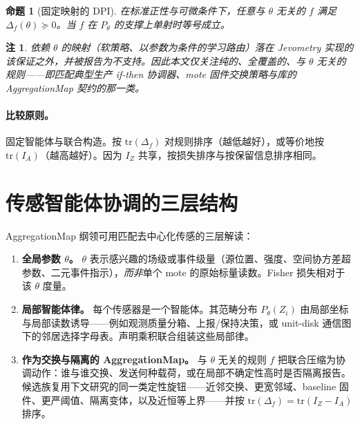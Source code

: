 \documentclass[11pt,a4paper]{article}
\newtheorem{proposition}{命题}
\newtheorem{remark}{注}
\begin{document}
\begin{proposition}[固定映射的 DPI]
在标准正性与可微条件下，任意与 $\theta$ 无关的 $f$ 满足 $\Delta_f(\theta)\succeq 0$。当 $f$ 在 $P_\theta$ 的支撑上单射时等号成立。
\end{proposition}

\begin{remark}
依赖 $\theta$ 的映射（软策略、以参数为条件的学习路由）落在 Jevometry 实现的该保证之外，并被报告为不支持。因此本文仅关注纯的、全覆盖的、与 $\theta$ 无关的规则——即匹配典型生产 if-then 协调器、mote 固件交换策略与库的 AggregationMap 契约的那一类。
\end{remark}

\paragraph{比较原则。}
固定智能体与联合构造。按 $\mathrm{tr}(\Delta_f)$ 对规则排序（越低越好），或等价地按 $\mathrm{tr}(I_A)$（越高越好）。因为 $I_Z$ 共享，按损失排序与按保留信息排序相同。

\section{传感智能体协调的三层结构}
\label{sec:sensor-layers}

AggregationMap 纲领可用匹配去中心化传感的三层解读：

\begin{enumerate}
  \item[(i)] \textbf{全局参数 $\theta$。}
  $\theta$ 表示感兴趣的场级或事件级量（源位置、强度、空间协方差超参数、二元事件指示），\emph{而非}单个 mote 的原始标量读数。Fisher 损失相对于该 $\theta$ 度量。

  \item[(ii)] \textbf{局部智能体律。}
  每个传感器是一个智能体。其范畴分布 $P_\theta(Z_i)$ 由局部坐标与局部读数诱导——例如观测质量分箱、上报/保持决策，或 unit-disk 通信图下的邻居选择字母表。声明乘积联合组装这些局部律。

  \item[(iii)] \textbf{作为交换与隔离的 AggregationMap。}
  与 $\theta$ 无关的规则 $f$ 把联合压缩为协调动作：谁与谁交换、发送何种载荷，或在局部不确定性高时是否隔离报告。候选族复用下文研究的同一类定性旋钮——近邻交换、更宽邻域、baseline 固件、更严阈值、隔离变体，以及近恒等上界——并按 $\mathrm{tr}(\Delta_f)=\mathrm{tr}(I_Z-I_A)$ 排序。
\end{enumerate}
\end{document}

